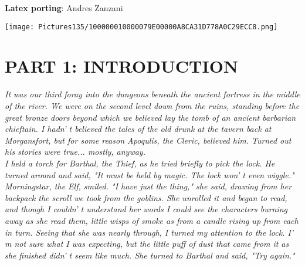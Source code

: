 \documentclass[a4paper,twoside,openany,10pt]{book}
\begin{document}
\textbf{Latex porting}: Andres Zanzani

\pagebreak

\thispagestyle{empty}

\onecolumn

\setcounter{page}{1}

\begin{multicols}{2}

\tableofcontents

\end{multicols}


\pagebreak

\thispagestyle{empty}

\texttt{[image: Pictures135/100000010000079E00000A8CA31D778A0C29ECC8.png]}

\pagebreak



\section{PART 1: INTRODUCTION}\label{part-1-introduction}

\textit{It was our third foray into the dungeons beneath the ancient fortress in the middle of the river. We were on the second level down from the ruins, standing before the great bronze doors beyond which we believed lay the tomb of an ancient barbarian chieftain. I hadn' t believed the tales of the old drunk at the tavern back at Morgansfort, but for some reason Apoqulis, the Cleric, believed him. Turned out his stories were true... mostly, anyway.}\\

\textit{I held a torch for Barthal, the Thief, as he tried briefly to pick the lock. He turned around and said, "It must be held by magic. The lock won' t even wiggle."}\\

\textit{Morningstar, the Elf, smiled. "I have just the thing," she said, drawing from her backpack the scroll we took from the goblins. She unrolled it and began to read, and though I couldn' t understand her words I could see the characters burning away as she read them, little wisps of smoke as from a candle rising up from each in turn. Seeing that she was nearly through, I turned my attention to the lock. I' m not sure what I was expecting, but the little puff of dust that came from it as she finished didn' t seem like much. She turned to Barthal and said, "Try again."}\\
\end{document}
